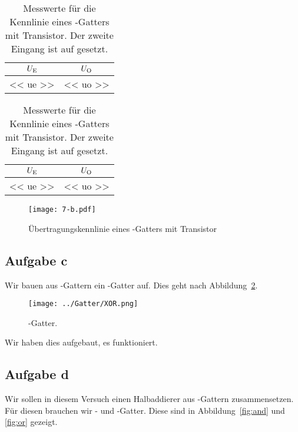 \begin{table}[htbp]
	\centering
	\begin{tabular}{SS}
		{$U_\text E$} & {$U_\text O$} \\
		\hline
		<< ue >> & << uo >> \\
	\end{tabular}
	\caption{%
		Messwerte für die Kennlinie eines \tnand-Gatters mit Transistor. Der
		zweite Eingang ist auf \thigh{} gesetzt.
	}
	\label{tab:b-high}
\end{table}

\begin{table}[htbp]
	\centering
	\begin{tabular}{SS}
		{$U_\text E$} & {$U_\text O$} \\
		\hline
		<< ue >> & << uo >> \\
	\end{tabular}
	\caption{%
		Messwerte für die Kennlinie eines \tnand-Gatters mit Transistor. Der
		zweite Eingang ist auf \tlow{} gesetzt.
	}
	\label{tab:b-low}
\end{table}

\begin{figure}[htbp]
    \centering
    \texttt{[image: 7-b.pdf]}
    \caption{%
        Übertragungskennlinie eines \tnand-Gatters mit Transistor
    }
    \label{fig:b}
\end{figure}

\FloatBarrier
\subsection{Aufgabe c}

Wir bauen aus \tnand-Gattern ein \txor-Gatter auf. Dies geht nach
Abbildung~\ref{fig:xor}.

\begin{figure}[htbp]
	\centering
	\texttt{[image: ../Gatter/XOR.png]}
	\caption{%
		\txor-Gatter.
		\cite[Seite~20]{wirsum/experimente_schaltglieder}
	}
	\label{fig:xor}
\end{figure}

Wir haben dies aufgebaut, es funktioniert.

\FloatBarrier
\subsection{Aufgabe d}

Wir sollen in diesem Versuch einen Halbaddierer aus \tnand-Gattern
zusammensetzen. Für diesen brauchen wir \tand- und \tor-Gatter. Diese sind in
Abbildung~\ref{fig:and} und \ref{fig:or} gezeigt.

